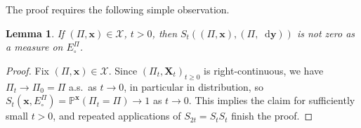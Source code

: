 \documentclass[reqno,draft]{amsart}
\numberwithin{equation}{section}
\theoremstyle{plain}
\newtheorem{lemma}[theorem]{Lemma}
\theoremstyle{remark}
\renewcommand{\P}{\mathbb{P}} %
\newcommand*\diff{\mathop{}\!\mathrm{d}}
\newcommand{\fpart}{\Pi} %
\newcommand{\semi}{S}
\begin{document}
The proof requires the following simple observation.
 \begin{lemma}\label{lem:Sspositive}
    If $(\fpart,\boldsymbol x) \in \mathcal{X}$, $t > 0$, then $\semi_t((\fpart,\boldsymbol x),(\fpart,\diff \boldsymbol y))$ is not zero as a measure on $E^{\fpart}_\circ $.
\end{lemma}
\begin{proof}
    Fix $(\fpart,\boldsymbol x) \in \mathcal{X}$. Since $(\fpart_t,\boldsymbol X_t)_{t \ge 0}$ is right-continuous, we have $\fpart_t \to \fpart_0 =\fpart$ a.s.\ as $t \to 0$, in particular in distribution, so $\semi_t(\boldsymbol x,E^\fpart_\circ ) = \P^{\boldsymbol x}(\fpart_t = \fpart) \to 1$ as $t \to 0$.
    This implies the claim for sufficiently small $t > 0$, and repeated applications of $\semi_{2t} = \semi_t \semi_t$ finish the proof.
\end{proof}
\end{document}
